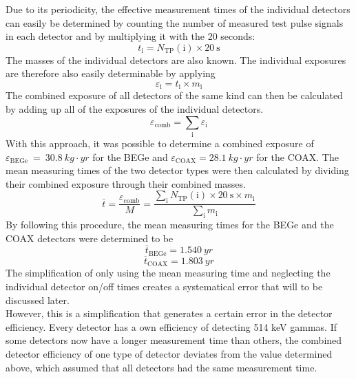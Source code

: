 \documentclass[encoding=utf8,british]{tumphthesis}
\begin{document}
Due to its periodicity, the effective measurement times of the individual detectors can easily be determined by counting the number of measured test pulse signals in each detector and by multiplying it with the 20 seconds:
\begin{equation}
    t_\mathrm{i} = N_{\mathrm{TP}}(\mathrm{i}) \times 20 \  \mathrm{s}
\end{equation}
The masses of the individual detectors are also known.
The individual exposures are therefore also easily determinable by applying 
\begin{equation}
    \varepsilon_\mathrm{i} = t_\mathrm{i} \times m_\mathrm{i}
\end{equation}
The combined exposure of all detectors of the same kind can then be calculated by adding up all of the exposures of the individual detectors.  
\begin{equation}
    \varepsilon_{\mathrm{comb}} = \sum_\mathrm{i} \varepsilon_\mathrm{i}
\end{equation}
With this approach, it was possible to determine a combined exposure of $\varepsilon_{\mathrm{BEGe}}~=~30.8~\unit{kg}\cdot\unit{yr}$ for the BEGe and $\varepsilon_{\mathrm{COAX}} = 28.1 \ \unit{kg}\cdot \unit{yr}  $ for the COAX.
The mean measuring times of the two detector types were then calculated by dividing their combined exposure through their combined masses. 
\begin{equation}
    \bar{t} = \frac{\varepsilon_{\mathrm{comb}}}{M} = \frac{\sum_\mathrm{i} N_{\mathrm{TP}}(\mathrm{i}) \times 20 \ \mathrm{s} \times m_\mathrm{i}}{\sum_\mathrm{i} m_\mathrm{i}}
\end{equation}
By following this procedure, the mean measuring times for the BEGe and the COAX detectors were determined to be
\begin{equation*}
   \bar{t}_{\mathrm{BEGe}} = 1.540 \ \unit{yr}  
\end{equation*}
\begin{equation*}
    \bar{t}_{\mathrm{COAX}} = 1.803 \ \unit{yr} 
\end{equation*}
The simplification of only using the mean measuring time and neglecting the individual detector on/off times creates a systematical error that will to be discussed later.
\\


\iffalse
However, this is a simplification that generates a certain error in the detector efficiency.
Every detector has a own efficiency of detecting 514 keV gammas.
If some detectors now have a longer measurement time than others, the combined detector efficiency of one type of detector deviates from the value determined above, which assumed that all detectors had the same measurement time.
\end{document}
